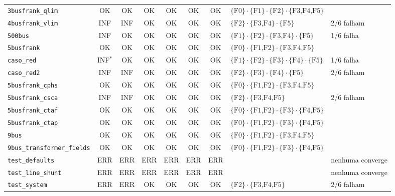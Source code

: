 \begin{landscape}
\begin{table}[!htbp]
{\begin{tabular}{lccccccll}
        \texttt{3busfrank\_qlim} & OK & OK & OK & OK & OK & OK & $\{\text{F0}\}\cdot\{\text{F1}\}\cdot\{\text{F2}\}\cdot\{\text{F3,F4,F5}\}$ &  \\
        \texttt{4busfrank\_vlim} & INF & INF & OK & OK & OK & OK & $\{\text{F2}\}\cdot\{\text{F3,F4}\}\cdot\{\text{F5}\}$ & 2/6 falham \\
        \texttt{500bus} & INF & OK & OK & OK & OK & OK & $\{\text{F1}\}\cdot\{\text{F2}\}\cdot\{\text{F3,F4}\}\cdot\{\text{F5}\}$ & 1/6 falha \\
        \texttt{5busfrank} & OK & OK & OK & OK & OK & OK & $\{\text{F0}\}\cdot\{\text{F1,F2}\}\cdot\{\text{F3,F4,F5}\}$ &  \\
        \texttt{caso\_red} & INF$^\ast$ & OK & OK & OK & OK & OK & $\{\text{F1}\}\cdot\{\text{F2}\}\cdot\{\text{F3}\}\cdot\{\text{F4}\}\cdot\{\text{F5}\}$ & 1/6 falha \\
        \texttt{caso\_red2} & INF & INF & OK & OK & OK & OK & $\{\text{F2}\}\cdot\{\text{F3}\}\cdot\{\text{F4}\}\cdot\{\text{F5}\}$ & 2/6 falham \\
        \texttt{5busfrank\_cphs} & OK & OK & OK & OK & OK & OK & $\{\text{F0}\}\cdot\{\text{F1,F2}\}\cdot\{\text{F3,F4,F5}\}$ &  \\
        \texttt{5busfrank\_csca} & INF & INF & OK & OK & OK & OK & $\{\text{F2}\}\cdot\{\text{F3,F4,F5}\}$ & 2/6 falham \\
        \texttt{5busfrank\_ctaf} & OK & OK & OK & OK & OK & OK & $\{\text{F0}\}\cdot\{\text{F1,F2}\}\cdot\{\text{F3}\}\cdot\{\text{F4,F5}\}$ &  \\
        \texttt{5busfrank\_ctap} & OK & OK & OK & OK & OK & OK & $\{\text{F0}\}\cdot\{\text{F1,F2}\}\cdot\{\text{F3}\}\cdot\{\text{F4,F5}\}$ &  \\
        \texttt{9bus} & OK & OK & OK & OK & OK & OK & $\{\text{F0}\}\cdot\{\text{F1,F2}\}\cdot\{\text{F3,F4,F5}\}$ &  \\
        \texttt{9bus\_transformer\_fields} & OK & OK & OK & OK & OK & OK & $\{\text{F0}\}\cdot\{\text{F1,F2}\}\cdot\{\text{F3}\}\cdot\{\text{F4,F5}\}$ &  \\
        \texttt{test\_defaults} & ERR & ERR & ERR & ERR & ERR & ERR &  & nenhuma converge \\
        \texttt{test\_line\_shunt} & ERR & ERR & ERR & ERR & ERR & ERR &  & nenhuma converge \\
        \texttt{test\_system} & ERR & ERR & OK & OK & OK & OK & $\{\text{F2}\}\cdot\{\text{F3,F4,F5}\}$ & 2/6 falham \\
        \bottomrule
    \end{tabular}
}{
}
\end{table}
\end{landscape}

